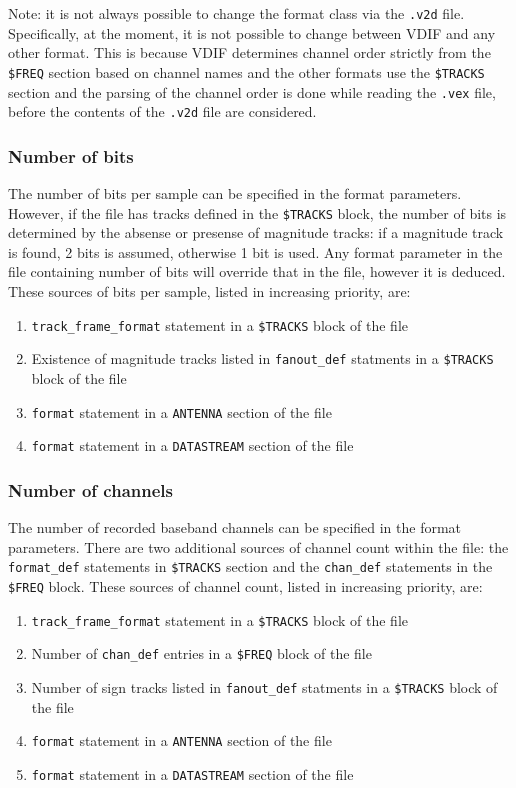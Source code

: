 \documentclass[12pt]{article}
\begin{document}
Note: it is not always possible to change the format class via the {\tt .v2d} file.
Specifically, at the moment, it is not possible to change between VDIF and any other format.
This is because VDIF determines channel order strictly from the {\tt \$FREQ} section based on channel names and the other formats use the {\tt \$TRACKS} section and the parsing of the channel order is done while reading the {\tt .vex} file, before the contents of the {\tt .v2d} file are considered.

\subsubsection{Number of bits}

The number of bits per sample can be specified in the format parameters.
However, if the \vx file has tracks defined in the {\tt \$TRACKS} block, the number of bits is determined by the absense or presense of magnitude tracks: if a magnitude track is found, 2 bits is assumed, otherwise 1 bit is used.
Any format parameter in the \vd file containing number of bits will override that in the \vx file, however it is deduced.
These sources of bits per sample, listed in increasing priority, are:
\begin{enumerate}
\item {\tt track\_frame\_format} statement in a {\tt \$TRACKS} block of the \vx file
\item Existence of magnitude tracks listed in {\tt fanout\_def} statments in a {\tt \$TRACKS} block of the \vx file
\item {\tt format} statement in a {\tt ANTENNA} section of the \vd file
\item {\tt format} statement in a {\tt DATASTREAM} section of the \vd file
\end{enumerate}

\subsubsection{Number of channels}

The number of recorded baseband channels can be specified in the format parameters.
There are two additional sources of channel count within the \vx file: the {\tt format\_def} statements in {\tt \$TRACKS} section and the {\tt chan\_def} statements in the {\tt \$FREQ} block. 
These sources of channel count, listed in increasing priority, are:
\begin{enumerate}
\item {\tt track\_frame\_format} statement in a {\tt \$TRACKS} block of the \vx file
\item Number of {\tt chan\_def} entries in a {\tt \$FREQ} block of the \vx file
\item Number of sign tracks listed in {\tt fanout\_def} statments in a {\tt \$TRACKS} block of the \vx file
\item {\tt format} statement in a {\tt ANTENNA} section of the \vd file
\item {\tt format} statement in a {\tt DATASTREAM} section of the \vd file
\end{enumerate}
\end{document}
